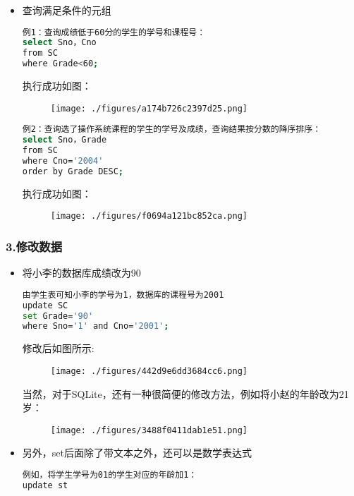 \begin{itemize}
\item 查询满足条件的元组
\begin{lstlisting}[language=bash]
例1：查询成绩低于60分的学生的学号和课程号：
select Sno，Cno
from SC
where Grade<60;
\end{lstlisting}
执行成功如图：
\begin{figure}[ht]
\centering
\texttt{[image: ./figures/a174b726c2397d25.png]}
\caption{} \label{fig_SQLint_22}
\end{figure}
\begin{lstlisting}[language=bash]
例2：查询选了操作系统课程的学生的学号及成绩，查询结果按分数的降序排序：
select Sno，Grade
from SC
where Cno='2004'
order by Grade DESC;
\end{lstlisting}
执行成功如图：
\begin{figure}[ht]
\centering
\texttt{[image: ./figures/f0694a121bc852ca.png]}
\caption{} \label{fig_SQLint_23}
\end{figure}
\end{itemize}


\subsubsection{3.修改数据}

\begin{itemize}
\item 将小李的数据库成绩改为90
\begin{lstlisting}[language=bash]
由学生表可知小李的学号为1，数据库的课程号为2001
update SC
set Grade='90'
where Sno='1' and Cno='2001';
\end{lstlisting}
修改后如图所示:
\begin{figure}[ht]
\centering
\texttt{[image: ./figures/442d9e6dd3684cc6.png]}
\caption{} \label{fig_SQLint_15}
\end{figure}
当然，对于SQLite，还有一种很简便的修改方法，例如将小赵的年龄改为21岁：
\begin{figure}[ht]
\centering
\texttt{[image: ./figures/3488f0411dab1e51.png]}
\caption{} \label{fig_SQLint_16}
\end{figure}
\end{itemize}
\begin{itemize}
\item 另外，set后面除了带文本之外，还可以是数学表达式
\begin{lstlisting}[language=bash]
例如，将学生学号为01的学生对应的年龄加1：
update st
\end{lstlisting}
\end{itemize}



